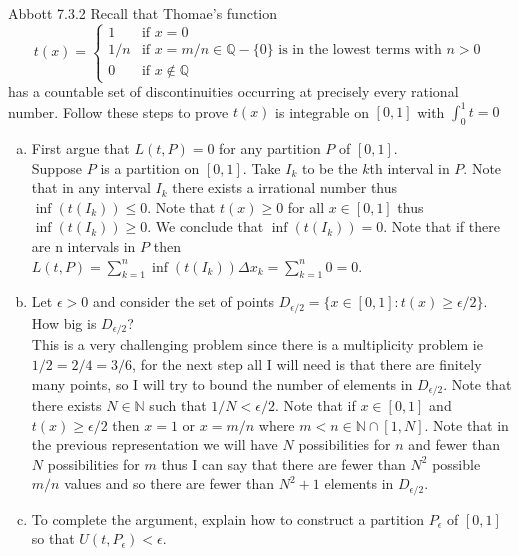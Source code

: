 \documentclass[12pt]{article}
\makeatletter
\theoremstyle{homework}
\newenvironment{exercise}[1]
{\def\@currentlabel{#1}\exercisecore}
{\endexercisecore}
\newcommand{\Rats}{\ensuremath{\mathbb Q}}
\makeatother
\begin{document}
\begin{exercise}
4
Abbott 7.3.2
\end{exercise}
Recall that Thomae's function
\[
t(x) = 
\begin{cases}
1 &\text{if } x = 0 \\
1/n &\text{if } x = m/n \in \Rats - \{0\}  \text{ is in the lowest terms with } n >0 \\
0 &\text{if } x \not \in\Rats 
\end{cases}
\]
has a countable set of discontinuities occurring at precisely every rational number. Follow these steps to prove $t(x)$ is integrable on $[0,1]$ with $\int_{0}^{1} t = 0$
\begin{enumerate}[(a)] 
\item First argue that $L(t,P) = 0$ for any partition $P$ of $[0,1]$.\\
Suppose $P$ is a partition on $[0,1]$.  Take $I_k$ to be the $k$th interval in $P$.  Note that in any interval $I_k$ there exists a irrational number thus $\inf(t(I_k))\leq 0$.  Note that $t(x)\geq 0$ for all $x\in[0,1]$ thus $\inf(t(I_k))\geq 0$.  We conclude that $\inf(t(I_k))=0$.  Note that if there are n intervals in $P$ then $L(t,P)=\sum_{k=1}^{n} \inf(t(I_k)) \Delta x_k=\sum_{k=1}^{n} 0=0$.
\item Let $\epsilon > 0$ and consider the set of points $D_{\epsilon/2} = \{ x \in [0,1] : t(x) \ge \epsilon/2 \}$. How big is $D_{\epsilon/2}$?\\
This is a very challenging problem since there is a multiplicity problem ie $1/2=2/4=3/6$, for the next step all I will need is that there are finitely many points, so I will try to bound the number of elements in $D_{\epsilon/2}$.  Note that there exists $N\in\mathbb{N}$ such that $1/N<\epsilon/2$.  Note that if $x \in [0,1]$ and $t(x) \geq \epsilon/2$ then $x=1$ or $x=m/n$ where $m<n\in\mathbb{N}\cap[1,N]$.  Note that in the previous representation we will have $N$ possibilities for $n$ and fewer than $N$ possibilities for $m$ thus I can say that there are fewer than $N^2$ possible $m/n$ values and so there are fewer than $N^2+1$ elements in $D_{\epsilon/2}$.
\item To complete the argument, explain how to construct a partition $P_{\epsilon}$ of $[0,1]$ so that $U(t,P_\epsilon) < \epsilon$.\\

\end{enumerate}
\end{document}

